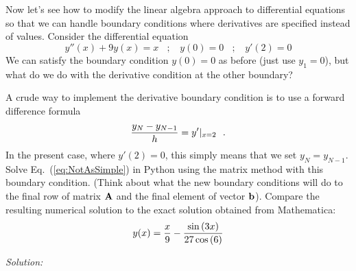 
Now let's see how to modify the linear algebra approach to
differential equations so that we can handle boundary conditions
where derivatives are specified instead of values. Consider the
differential equation
\begin{equation}\label{eq:NotAsSimple}
    y''(x) + 9 y(x) = x~~~~;~~~~y(0)=0~~~~;~~~~y'(2)=0
\end{equation}
We can satisfy the boundary condition $y(0)=0$ as before (just use
$y_1=0$), but what do we do with the derivative condition at the
other boundary?

\begin{enumerate}
\probtwo \label{P:10.3}
\begin{enumerate}
\subprob \label{P:2.3a}  

  A crude way to implement the derivative boundary condition is to use
  a forward difference formula
    \begin{equation}
        {y_N-y_{N-1} \over h} = y'|_{x=2}~~.
    \end{equation}
    In the present case, where $y'(2)=0$, this simply means
    that we set $y_N=y_{N-1}$. Solve
    Eq.~(\ref{eq:NotAsSimple}) in Python using the matrix
    method with this boundary condition. (Think about what
    the new boundary conditions will do to the final row of
    matrix ${\bf A}$ and the final element of vector ${\bf
    b}$).  Compare the resulting numerical solution to the
    exact solution obtained from Mathematica:
    \begin{equation}
        y(x)={x \over 9} - {\sin{(3 x)} \over 27 \cos{(6)}}
    \end{equation}

\end{enumerate}
\end{enumerate}
\ifsolutions
\textit{Solution:}\\
